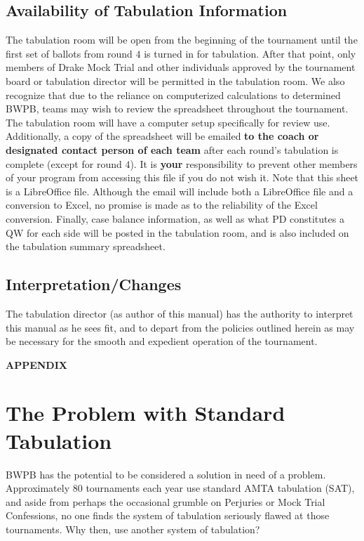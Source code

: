 \documentclass{article}
\begin{document}
\subsection{Availability of Tabulation Information}
The tabulation room will be open from the beginning of the tournament until the first set of ballots from round $4$ is turned in for tabulation.  After that point, only members of Drake Mock Trial and other individuals approved by the tournament board or tabulation director will be permitted in the tabulation room.  We also recognize that due to the reliance on computerized calculations to determined BWPB, teams may wish to review the spreadsheet throughout the tournament.  The tabulation room will have a computer setup specifically for review use.  Additionally, a copy of the spreadsheet will be emailed \textbf{to the coach or designated contact person of each team} after each round's tabulation is complete (except for round $4$). It is \textbf{your} responsibility to prevent other members of your program from accessing this file if you do not wish it. Note that this sheet is a LibreOffice file. Although the email will include both a LibreOffice file and a conversion to Excel, no promise is made as to the reliability of the Excel conversion. Finally, case balance information, as well as what PD constitutes a QW for each side will be posted in the tabulation room, and is also included on the tabulation summary spreadsheet.
\subsection{Interpretation/Changes}
The tabulation director (as author of this manual) has the authority to interpret this manual as he sees fit, and to depart from the policies outlined herein as may be necessary for the smooth and expedient operation of the tournament.
\pagebreak
\appendix
\begin{center}
      {\bf APPENDIX}
    \end{center}
\section{The Problem with Standard Tabulation}
BWPB has the potential to be considered a solution in need of a problem.  Approximately 80 tournaments each year use standard AMTA tabulation (SAT), and aside from perhaps the occasional grumble on Perjuries or Mock Trial Confessions, no one finds the system of tabulation seriously flawed at those tournaments.  Why then, use another system of tabulation?
\end{document}
